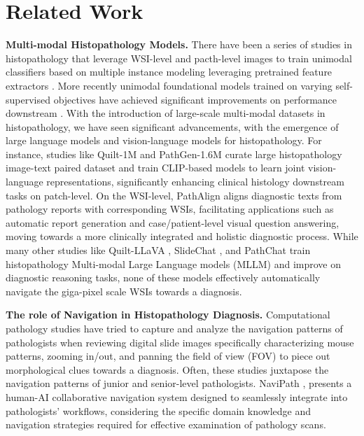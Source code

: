 \section{Related Work}
\textbf{Multi-modal Histopathology Models.} 
There have been a series of studies in histopathology that leverage WSI-level and pacth-level images to train unimodal classifiers based on multiple instance modeling leveraging pretrained feature extractors \cite{shao2021transmil, scatnet, hatnet}. More recently unimodal foundational models trained on varying self-supervised objectives have achieved significant improvements on performance downstream \cite{xu2024whole, virchow, ikezogwo2022multi, uni}. With the introduction of large-scale multi-modal datasets in histopathology, we have seen significant advancements, with the emergence of large language models and vision-language models for histopathology. For instance, studies like Quilt-1M \cite{ikezogwo2023quilt} and PathGen-1.6M \cite{sun2024pathgen} curate large histopathology image-text paired dataset and train CLIP-based models to learn joint vision-language representations, significantly enhancing clinical histology downstream tasks on patch-level. On the WSI-level, PathAlign \cite{ahmed2024pathalign} aligns diagnostic texts from pathology reports with corresponding WSIs, facilitating applications such as automatic report generation and case/patient-level visual question answering, moving towards a more clinically integrated and holistic diagnostic process. While many other studies like Quilt-LLaVA \cite{seyfioglu2024quilt}, SlideChat \cite{chen2024slidechat}, and PathChat \cite{pathchat} train histopathology Multi-modal Large Language models (MLLM) and improve on diagnostic reasoning tasks, none of these models effectively automatically navigate the giga-pixel scale WSIs towards a diagnosis.

\noindent\textbf{The role of Navigation in Histopathology Diagnosis.}
Computational pathology studies have tried to capture and analyze the navigation patterns of pathologists when reviewing digital slide images \cite{roa2010experimental, mercan2018characterizing, molin2015slide, ghezloo2022analysis} specifically characterizing mouse patterns, zooming in/out, and panning the field of view (FOV) to piece out morphological clues towards a diagnosis. Often, these studies juxtapose the navigation patterns of junior and senior-level pathologists. NaviPath \cite{gu2023augmenting}, presents a human-AI collaborative navigation system designed to seamlessly integrate into pathologists' workflows, considering the specific domain knowledge and navigation strategies required for effective examination of pathology scans. 

